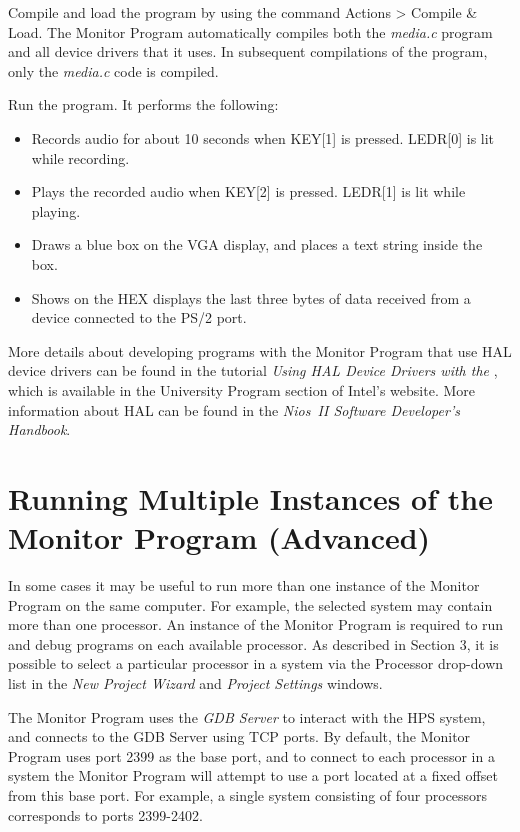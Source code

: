 \documentclass[11pt, twoside, pdftex]{article}
\begin{document}
Compile and load the program by using the command 
{\sf Actions > Compile \& Load}. 
The Monitor Program automatically compiles both the {\it media.c}
program and all device drivers that it uses. In subsequent
compilations of the program, only the {\it media.c} code is
compiled. 

Run the program. It performs the following: 
\begin{itemize}
\item
Records audio for about 10 seconds when KEY[1] is pressed. 
LEDR[0] is lit while recording.
\item 
Plays the recorded audio when KEY[2] is pressed. LEDR[1] is lit while playing.
\item
Draws a blue box on the VGA display, and places a text string inside the box.
\item
Shows on the HEX displays the last three bytes of data received from a device connected to the PS/2 port. 
\end{itemize}

More details about developing programs with the Monitor Program
that use HAL device drivers can be found in the tutorial 
{\it Using HAL Device Drivers with the \productNameMed{}}, which is available in the University Program section of Intel's
website. More information about HAL can be found in the
{\it Nios~II Software Developer's Handbook}.

\newpage
\section{Running Multiple Instances of the Monitor Program (Advanced)}

In some cases it may be useful to run more than one instance of
the Monitor Program on the same computer. For example, the
selected system may contain more than one processor. 
An instance of the Monitor Program is required to run and debug
programs on each available processor. As described in 
Section 3, it is possible to select a particular processor
in a system via the \textsf{Processor} drop-down
list in the {\it New Project Wizard} and {\it Project Settings}
windows.

The Monitor Program uses the {\it GDB Server} to interact with
the HPS system, and connects to the GDB Server using TCP ports.
By default, the Monitor Program uses port 2399 as the base port,
and to connect to each processor in a system the Monitor Program
will attempt to use a port located at a fixed offset from this
base port. For example, a single system consisting of four
processors corresponds to ports 2399-2402.
\end{document}
